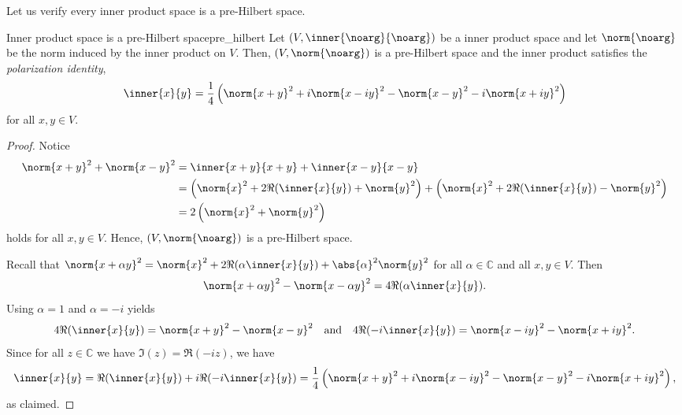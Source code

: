 Let us verify every inner product space is a pre-Hilbert space.
\begin{proposition}{Inner product space is a pre-Hilbert space}{pre_hilbert}
    Let \((V, \inner{\noarg}{\noarg})\) be a inner product space and let \(\norm{\noarg}\) be the norm induced by the inner product on \(V\). Then, \((V, \norm{\noarg})\) is a pre-Hilbert space and the inner product satisfies the \emph{polarization identity},
    \begin{equation*}
        \inner{x}{y} = \frac14\left(\norm{x + y}^2 + i\norm{x - iy}^2 - \norm{x - y}^2 - i\norm{x + iy}^2\right)
    \end{equation*}
    for all \(x, y \in V\).
\end{proposition}
\begin{proof}
    Notice
    \begin{align*}
        \norm{x + y}^2 + \norm{x - y}^2 &= \inner{x+y}{x+y} + \inner{x - y}{x - y}\\
                                        &= \left(\norm{x}^2 + 2\Re(\inner{x}{y}) + \norm{y}^2\right) + \left(\norm{x}^2 + 2\Re(\inner{x}{y}) - \norm{y}^2\right) \\
                                        &= 2\left(\norm{x}^2 + \norm{y}^2\right)
    \end{align*}
    holds for all \(x,y \in V\). Hence, \((V, \norm{\noarg})\) is a pre-Hilbert space.

    Recall that \(\norm{x + \alpha y}^2 = \norm{x}^2 + 2\Re(\alpha \inner{x}{y}) + \abs{\alpha}^2 \norm{y}^2\) for all \(\alpha \in \mathbb{C}\) and all \(x,y \in V\). Then
    \begin{equation*}
        \norm{x + \alpha y}^2 - \norm{x - \alpha y}^2 = 4 \Re(\alpha \inner{x}{y}).
    \end{equation*}
    Using \(\alpha = 1\) and \(\alpha = -i\) yields
    \begin{equation*}
        4\Re(\inner{x}{y}) = \norm{x + y}^2 - \norm{x - y}^2\quad\text{and}\quad 4\Re(-i\inner{x}{y}) = \norm{x - iy}^2 - \norm{x + iy}^2.
    \end{equation*}
    Since for all \(z \in \mathbb{C}\) we have \(\Im(z) = \Re(-iz)\), we have
    \begin{equation*}
        \inner{x}{y} = \Re(\inner{x}{y}) + i \Re(-i\inner{x}{y}) = \frac14\left(\norm{x + y}^2 + i \norm{x - iy}^2 - \norm{x - y}^2 - i \norm{x + iy}^2\right),
    \end{equation*}
    as claimed.
\end{proof}

